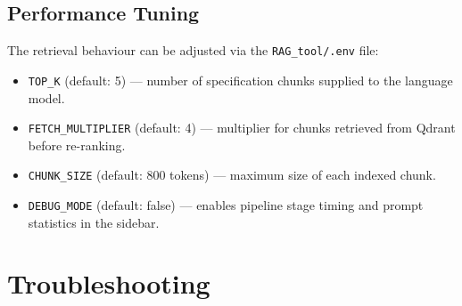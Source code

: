 \subsection{Performance Tuning}

The retrieval behaviour can be adjusted via the \texttt{RAG\_tool/.env} file:

\begin{itemize}
    \item \texttt{TOP\_K} (default: 5) — number of specification chunks supplied to the language model.
    \item \texttt{FETCH\_MULTIPLIER} (default: 4) — multiplier for chunks retrieved from Qdrant before re-ranking.
    \item \texttt{CHUNK\_SIZE} (default: 800 tokens) — maximum size of each indexed chunk.
    \item \texttt{DEBUG\_MODE} (default: false) — enables pipeline stage timing and prompt statistics in the sidebar.
\end{itemize}

\section{Troubleshooting}

